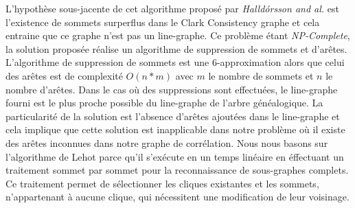 L'hypoth\`ese sous-jacente de cet algorithme propos\'e par {\em Halld{\'o}rsson and al.} est l'existence de sommets surperflus dans le Clark Consistency graphe et cela entraine que ce graphe n'est pas un line-graphe. 
Ce probl\`eme \'etant {\em NP-Complete}, la solution propos\'ee r\'ealise un algorithme de suppression de sommets et d'ar\^etes. 
L'algorithme de suppression de sommets est une 6-approximation alors que celui des ar\^etes est de complexit\'e $O(n*m)$ avec $m$ le nombre de sommets et $n$ le nombre d'ar\^etes.
Dans le cas o\`u des suppressions sont effectu\'ees, le line-graphe fourni est le plus proche possible du line-graphe de l'arbre g\'en\'ealogique.
La particularit\'e de la solution est l'absence d'ar\^etes ajout\'ees dans le line-graphe et cela implique que cette solution est inapplicable dans notre probl\`eme o\`u il existe des ar\^etes inconnues dans notre graphe de corr\'elation.
\newline
Nous nous basons sur l'algorithme de Lehot parce qu'il s'ex\'ecute en un temps lin\'eaire en \'effectuant un traitement sommet par sommet pour la reconnaissance de sous-graphes complets. Ce traitement permet de s\'electionner les cliques existantes et les sommets, n'appartenant \`a aucune clique, qui n\'ecessitent une modification de leur voisinage.